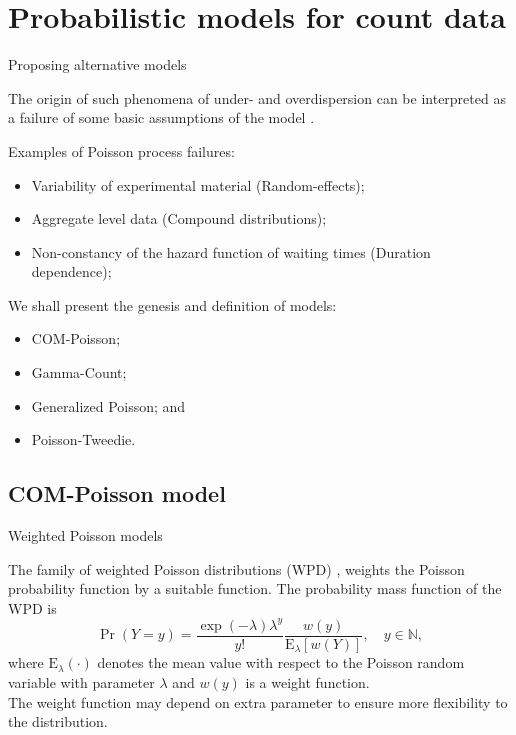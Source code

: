 \documentclass[11pt]{beamer}\usepackage[]{graphicx}\usepackage[]{color}
\begin{document}
\section{Probabilistic models for count data}

\begin{frame}{Proposing alternative models}

  The origin of such phenomena of under- and overdispersion can be
  interpreted as a failure of some basic assumptions of the model
  \citep{Hinde1998}.
  \vspace{0.2cm}

  Examples of Poisson process failures:
  \begin{itemize}
  \item Variability of experimental material (Random-effects);
  \item Aggregate level data (Compound distributions);
  \item Non-constancy of the hazard function of waiting times
    (Duration dependence);
  \end{itemize}
  \vspace{0.2cm}\pause

  We shall present the genesis and definition of models:
  \begin{itemize}
    \item COM-Poisson;
    \item Gamma-Count;
    \item Generalized Poisson; and
    \item Poisson-Tweedie.
  \end{itemize}
\end{frame}

\subsection{COM-Poisson model}

\begin{frame}{Weighted Poisson models}

  The family of weighted Poisson distributions (WPD)
  \citep{DelCastillo1998}, weights the Poisson probability function by a
  suitable function. The probability mass function of the WPD is
  $$
    \Pr(Y = y) = \frac{\exp(-\lambda)\lambda^y}{y!}
    \frac{w(y)}{\text{E}_\lambda[w(Y)]}, \quad y \in \mathbb{N},
  $$
  where $\text{E}_\lambda(\cdot)$ denotes the mean value with respect to
  the Poisson random variable with parameter $\lambda$ and $w(y)$ is a
  weight function.\\[0.5cm]

  The weight function may depend on extra parameter to ensure more
  flexibility to the distribution.
\end{frame}
\end{document}
